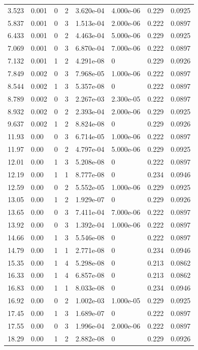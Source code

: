 \documentclass[preview]{standalone}
\begin{document}
{{\begin{tabular}{L{1.2cm}C{1.2cm} C{0.3cm}C{0.5cm} C{1.4cm}C{1.4cm} C{1.4cm}C{1.4cm}}
  3.523  &  0.001  & 0     &  2 &  3.620e-04  & 4.000e-06  & 0.229 &  0.0925   \\ 
  5.837  &  0.001  & 0     &  3 &  1.513e-04  & 2.000e-06  & 0.222 &  0.0897   \\ 
  6.433  &  0.001  & 0     &  2 &  4.463e-04  & 5.000e-06  & 0.229 &  0.0925   \\ 
  7.069  &  0.001  & 0     &  3 &  6.870e-04  & 7.000e-06  & 0.222 &  0.0897   \\ 
  7.132  &  0.001  & 1     &  2 &  4.291e-08  & 0  & 0.229 &  0.0926   \\ 
  7.849  &  0.002  & 0     &  3 &  7.968e-05  & 1.000e-06  & 0.222 &  0.0897   \\ 
  8.544  &  0.002  & 1     &  3 &  5.357e-08  & 0  & 0.222 &  0.0897   \\ 
  8.789  &  0.002  & 0     &  3 &  2.267e-03  & 2.300e-05  & 0.222 &  0.0897   \\ 
  8.932  &  0.002  & 0     &  2 &  2.393e-04  & 2.000e-06  & 0.229 &  0.0925   \\ 
  9.637  &  0.002  & 1     &  2 &  8.824e-08  & 0  & 0.229 &  0.0926   \\ 
  11.93  &  0.00  & 0     &  3 &  6.714e-05  & 1.000e-06  & 0.222 &  0.0897   \\ 
  11.97  &  0.00  & 0     &  2 &  4.797e-04  & 5.000e-06  & 0.229 &  0.0925   \\ 
  12.01  &  0.00  & 1     &  3 &  5.208e-08  & 0  & 0.222 &  0.0897   \\ 
  12.19  &  0.00  & 1     &  1 &  8.777e-08  & 0  & 0.234 &  0.0946   \\ 
  12.59  &  0.00  & 0     &  2 &  5.552e-05  & 1.000e-06  & 0.229 &  0.0925   \\ 
  13.05  &  0.00  & 1     &  2 &  1.929e-07  & 0  & 0.229 &  0.0926   \\ 
  13.65  &  0.00  & 0     &  3 &  7.411e-04  & 7.000e-06  & 0.222 &  0.0897   \\ 
  13.92  &  0.00  & 0     &  3 &  1.392e-04  & 1.000e-06  & 0.222 &  0.0897   \\ 
  14.66  &  0.00  & 1     &  3 &  5.546e-08  & 0  & 0.222 &  0.0897   \\ 
  14.79  &  0.00  & 1     &  1 &  2.771e-08  & 0  & 0.234 &  0.0946   \\ 
  15.35  &  0.00  & 1     &  4 &  5.298e-08  & 0  & 0.213 &  0.0862   \\ 
  16.33  &  0.00  & 1     &  4 &  6.857e-08  & 0  & 0.213 &  0.0862   \\ 
  16.83  &  0.00  & 1     &  1 &  8.033e-08  & 0  & 0.234 &  0.0946   \\ 
  16.92  &  0.00  & 0     &  2 &  1.002e-03  & 1.000e-05  & 0.229 &  0.0925   \\ 
  17.45  &  0.00  & 1     &  3 &  1.689e-07  & 0  & 0.222 &  0.0897   \\ 
  17.55  &  0.00  & 0     &  3 &  1.996e-04  & 2.000e-06  & 0.222 &  0.0897   \\ 
  18.29  &  0.00  & 1     &  2 &  2.882e-08  & 0  & 0.229 &  0.0926   \\ 
\hline 
\end{tabular} 

}}
\end{document}

